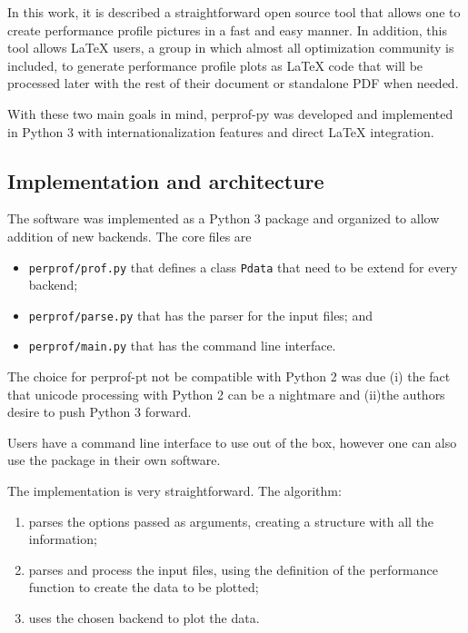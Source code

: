     In this work, it is described a straightforward open source tool that
    allows  one to create  performance profile pictures in a fast and easy
    manner.
    In addition, this tool  allows LaTeX users, a group in which almost
    all optimization community is included, to generate performance profile
    plots as LaTeX code that will be processed later  with the rest of their document or standalone PDF when needed.

    With these two main goals in mind,  perprof-py was developed and 
    implemented in Python 3 with internationalization features and direct LaTeX
    integration.

\subsection*{Implementation and architecture}

    The software was implemented as a Python 3 package
    and organized to allow addition of new backends.
    The core files are
    \begin{itemize}
      \item {\tt perprof/prof.py} that defines a class {\tt Pdata} that need to
        be extend for every backend;
      \item {\tt perprof/parse.py} that has the parser for the input files; and
      \item {\tt perprof/main.py} that has the command line interface.
    \end{itemize}

    The choice for perprof-pt not be compatible with Python 2
    was due (i) the fact that unicode processing with Python 2 can be a nightmare and
    (ii)the authors desire to push Python 3 forward.

    Users have a command line interface to use out of the box,
    however one can also use the package in their own software.

    The implementation is very straightforward. The algorithm:
    \begin{enumerate}
      \item parses the options passed as arguments, creating a
        structure with all the information;
      \item parses and process the input files, using the definition
        of the performance function to create the data to be plotted;
      \item uses the chosen backend to plot the data.
    \end{enumerate}


